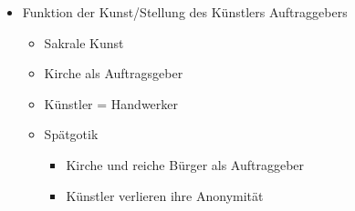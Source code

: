\begin{itemize}
	\item Funktion der Kunst/Stellung des Künstlers Auftraggebers
	\begin{itemize}
		\item Sakrale Kunst
		\item Kirche als Auftragsgeber
		\item Künstler = Handwerker
		\item Spätgotik
		\begin{itemize}
			\item Kirche und reiche Bürger als Auftraggeber
			\item Künstler verlieren ihre Anonymität
		\end{itemize}
	\end{itemize}
\end{itemize}
